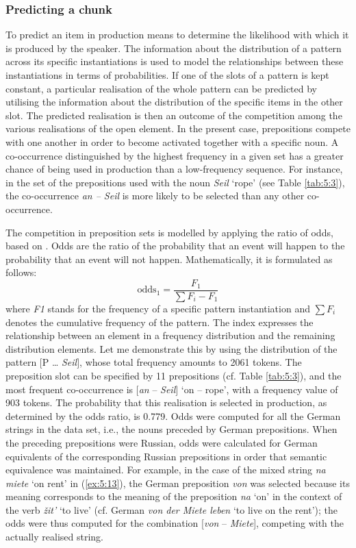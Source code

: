 \subsubsection{Predicting a chunk}{\label{odds}}

\noindent To predict an item in production means to determine the likelihood with which it is produced by the speaker. The information about the distribution of a pattern across its specific instantiations is used to model the relationships between these instantiations in terms of probabilities. If one of the slots of a pattern is kept constant, a particular realisation of the whole pattern can be predicted by utilising the information about the distribution of the specific items in the other slot. The predicted realisation is then an outcome of the competition among the various realisations of the open element. In the present case, prepositions compete with one another in order to become activated together with a specific noun. A co-occurrence distinguished by the highest frequency in a given set has a greater chance of being used in production than a low-frequency sequence. For instance, in the set of the prepositions used with the noun \textit{Seil} `rope' (see Table \ref{tab:5:3}), the co-occurrence \textit{an -- Seil} is more likely to be selected than any other co-occurrence.

The competition in preposition sets is modelled by applying the ratio of odds, based on \citet[119--121]{fahrmeir-etal-2007}. Odds are the ratio of the probability that an event will happen to the probability that an event will not happen. Mathematically, it is formulated as follows: \[ \text{odds}_{1} = \frac{F_{1}}{\sum F_{i}-F_{1}} \]
where \textit{F1} stands for the frequency of a specific pattern instantiation and $\sum F_{i}$ denotes the cumulative frequency of the pattern. The index expresses the relationship between an element in a frequency distribution and the remaining distribution elements. Let me demonstrate this by using the distribution of the pattern $[$P \dots{} \textit{Seil}$]$, whose total frequency amounts to 2061 tokens. The preposition slot can be specified by 11 prepositions (cf. Table \ref{tab:5:3}), and  the most frequent co-occurrence is $[$\textit{an} -- \textit{Seil}$]$ `on -- rope', with a frequency value of 903 tokens. The probability that this realisation is selected in production, as determined by the odds ratio, is 0.779. Odds were computed for all the German strings in the data set, i.e., the nouns preceded by German prepositions. When the preceding prepositions were Russian, odds were calculated for German equivalents of the corresponding Russian prepositions in order that semantic equivalence was maintained. For example, in the case of the mixed string \textit{na miete} `on rent' in (\ref{ex:5:13}), the German preposition \textit{von} was selected because its meaning corresponds to the meaning of the preposition \textit{na} `on' in the context of the verb \textit{žit'} `to live' (cf. German \textit{von der Miete leben} `to live on the rent'); the odds were thus computed for the combination [\textit{von}  --  \textit{Miete}], competing with the actually realised string.

